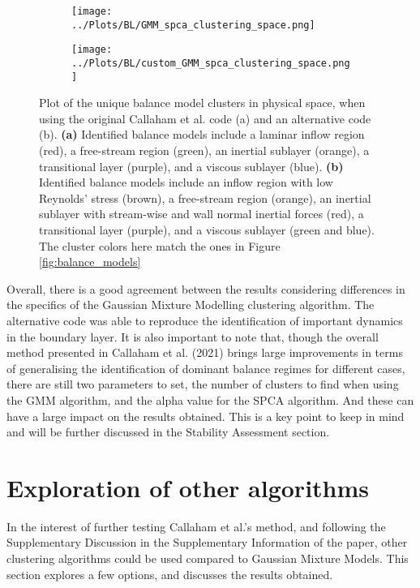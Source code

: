 \documentclass[12pt]{report} %
\begin{document}
\begin{figure}[htbp]
  \centering
  \begin{subfigure}[b]{0.7\textwidth}
      \texttt{[image: ../Plots/BL/GMM\_spca\_clustering\_space.png]}
      \caption{}
  \end{subfigure}
  \begin{subfigure}[b]{0.7\textwidth}
      \texttt{[image: ../Plots/BL/custom\_GMM\_spca\_clustering\_space.png]}
      \caption{}
  \end{subfigure}
  \caption{Plot of the unique balance model clusters in physical space, when using the original Callaham et al. code (a) and an alternative code (b). \textbf{(a)} Identified balance models include a laminar inflow region (red), a free-stream region (green), an inertial sublayer (orange), a transitional layer (purple), and a viscous sublayer (blue). \textbf{(b)} Identified balance models include an inflow region with low Reynolds' stress (brown), a free-stream region (orange), an inertial sublayer with stream-wise and wall normal inertial forces (red), a transitional layer (purple), and a viscous sublayer (green and blue). The cluster colors here match the ones in Figure \ref{fig:balance_models}}
  \label{fig:balance_model_clusters}
\end{figure}

Overall, there is a good agreement between the results considering differences in the specifics of the Gaussian Mixture Modelling clustering algorithm. The alternative code was able to reproduce the identification of important dynamics in the boundary layer. It is also important to note that, though the overall method presented in Callaham et al. (2021)\cite{callaham2021learning} brings large improvements in terms of generalising the identification of dominant balance regimes for different cases, there are still two parameters to set, the number of clusters to find when using the GMM algorithm, and the alpha value for the SPCA algorithm. And these can have a large impact on the results obtained. This is a key point to keep in mind and will be further discussed in the Stability Assessment section.


\section{Exploration of other algorithms}

In the interest of further testing Callaham et al.'s method, and following the Supplementary Discussion in the Supplementary Information of the paper\cite{callaham2021learning}, other clustering algorithms could be used compared to Gaussian Mixture Models. This section explores a few options, and discusses the results obtained.
\end{document}
